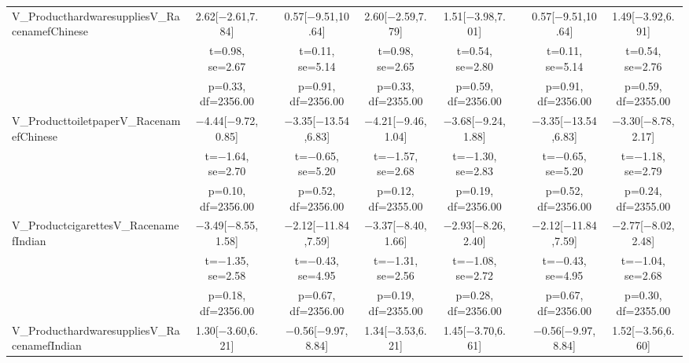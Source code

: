\documentclass[]{report}
\begin{document}
\begin{table}
{\begin{tabular}[t]{lcccccccc}
		V\_ProducthardwaresuppliesV\_RacenamefChinese & \num{2.62}[\num{-2.61},\num{7.84}] &  & \num{0.57}[\num{-9.51},\num{10.64}] & \num{2.60}[\num{-2.59},\num{7.79}] & \num{1.51}[\num{-3.98},\num{7.01}] &  & \num{0.57}[\num{-9.51},\num{10.64}] & \num{1.49}[\num{-3.92},\num{6.91}]\\
		& t=\num{0.98}, se=\num{2.67} &  & t=\num{0.11}, se=\num{5.14} & t=\num{0.98}, se=\num{2.65} & t=\num{0.54}, se=\num{2.80} &  & t=\num{0.11}, se=\num{5.14} & t=\num{0.54}, se=\num{2.76}\\
		& p=\num{0.33}, df=\num{2356.00} &  & p=\num{0.91}, df=\num{2356.00} & p=\num{0.33}, df=\num{2355.00} & p=\num{0.59}, df=\num{2356.00} &  & p=\num{0.91}, df=\num{2356.00} & p=\num{0.59}, df=\num{2355.00}\\
		V\_ProducttoiletpaperV\_RacenamefChinese & \num{-4.44}[\num{-9.72},\num{0.85}] &  & \num{-3.35}[\num{-13.54},\num{6.83}] & \num{-4.21}[\num{-9.46},\num{1.04}] & \num{-3.68}[\num{-9.24},\num{1.88}] &  & \num{-3.35}[\num{-13.54},\num{6.83}] & \num{-3.30}[\num{-8.78},\num{2.17}]\\
		& t=\num{-1.64}, se=\num{2.70} &  & t=\num{-0.65}, se=\num{5.20} & t=\num{-1.57}, se=\num{2.68} & t=\num{-1.30}, se=\num{2.83} &  & t=\num{-0.65}, se=\num{5.20} & t=\num{-1.18}, se=\num{2.79}\\
		& p=\num{0.10}, df=\num{2356.00} &  & p=\num{0.52}, df=\num{2356.00} & p=\num{0.12}, df=\num{2355.00} & p=\num{0.19}, df=\num{2356.00} &  & p=\num{0.52}, df=\num{2356.00} & p=\num{0.24}, df=\num{2355.00}\\
		V\_ProductcigarettesV\_RacenamefIndian & \num{-3.49}[\num{-8.55},\num{1.58}] &  & \num{-2.12}[\num{-11.84},\num{7.59}] & \num{-3.37}[\num{-8.40},\num{1.66}] & \num{-2.93}[\num{-8.26},\num{2.40}] &  & \num{-2.12}[\num{-11.84},\num{7.59}] & \num{-2.77}[\num{-8.02},\num{2.48}]\\
		& t=\num{-1.35}, se=\num{2.58} &  & t=\num{-0.43}, se=\num{4.95} & t=\num{-1.31}, se=\num{2.56} & t=\num{-1.08}, se=\num{2.72} &  & t=\num{-0.43}, se=\num{4.95} & t=\num{-1.04}, se=\num{2.68}\\
		& p=\num{0.18}, df=\num{2356.00} &  & p=\num{0.67}, df=\num{2356.00} & p=\num{0.19}, df=\num{2355.00} & p=\num{0.28}, df=\num{2356.00} &  & p=\num{0.67}, df=\num{2356.00} & p=\num{0.30}, df=\num{2355.00}\\
		V\_ProducthardwaresuppliesV\_RacenamefIndian & \num{1.30}[\num{-3.60},\num{6.21}] &  & \num{-0.56}[\num{-9.97},\num{8.84}] & \num{1.34}[\num{-3.53},\num{6.21}] & \num{1.45}[\num{-3.70},\num{6.61}] &  & \num{-0.56}[\num{-9.97},\num{8.84}] & \num{1.52}[\num{-3.56},\num{6.60}]\\

\end{tabular}}
\end{table}
\end{document}
